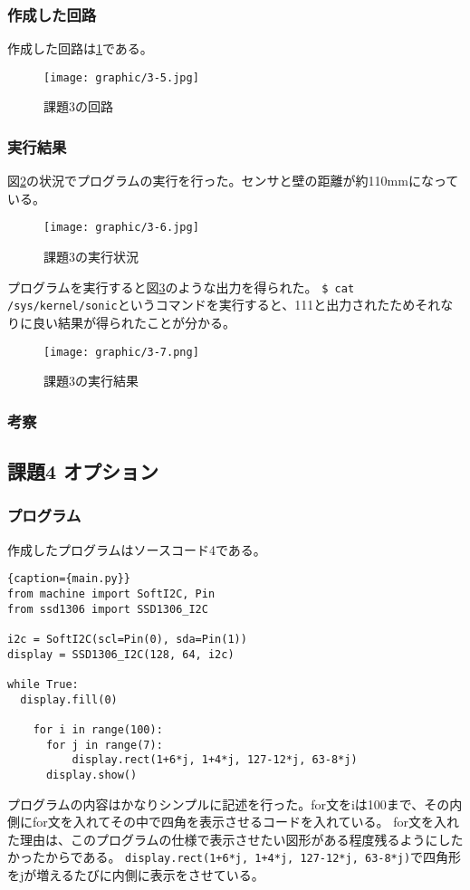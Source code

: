 \documentclass[dvipdfmx]{jsarticle}
\begin{document}
\subsubsection{作成した回路}
作成した回路は\ref*{fig:3-5}である。
\begin{figure}[H]
  \begin{center}
    \texttt{[image: graphic/3-5.jpg]}
  \end{center}
  \caption[]{課題3の回路}
  \label{fig:3-5}
\end{figure}

\subsubsection{実行結果}
図\ref*{fig:3-6}の状況でプログラムの実行を行った。センサと壁の距離が約110mmになっている。
\begin{figure}[H]
  \begin{center}
    \texttt{[image: graphic/3-6.jpg]}
  \end{center}
  \caption[]{課題3の実行状況}
  \label{fig:3-6}
\end{figure}
プログラムを実行すると図\ref*{fig:3-7}のような出力を得られた。
\texttt{\$ cat /sys/kernel/sonic}というコマンドを実行すると、111と出力されたためそれなりに良い結果が得られたことが分かる。
\begin{figure}[H]
  \begin{center}
    \texttt{[image: graphic/3-7.png]}
  \end{center}
  \caption{課題3の実行結果}
  \label{fig:3-7}
\end{figure}
\subsubsection{考察}


\subsection{課題4 オプション}
\subsubsection{プログラム}
作成したプログラムはソースコード4である。
\begin{lstlisting}{caption={main.py}}
from machine import SoftI2C, Pin
from ssd1306 import SSD1306_I2C

i2c = SoftI2C(scl=Pin(0), sda=Pin(1))
display = SSD1306_I2C(128, 64, i2c)

while True:
  display.fill(0)

    for i in range(100):
      for j in range(7):
          display.rect(1+6*j, 1+4*j, 127-12*j, 63-8*j)
      display.show()
\end{lstlisting}
プログラムの内容はかなりシンプルに記述を行った。for文をiは100まで、その内側にfor文を入れてその中で四角を表示させるコードを入れている。
for文を入れた理由は、このプログラムの仕様で表示させたい図形がある程度残るようにしたかったからである。
\texttt{display.rect(1+6*j, 1+4*j, 127-12*j, 63-8*j)}で四角形をjが増えるたびに内側に表示をさせている。
\end{document}
